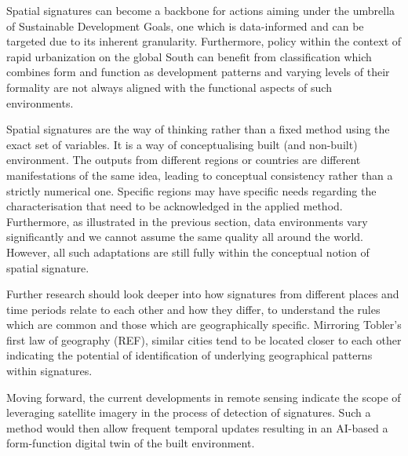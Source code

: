Spatial signatures can become a backbone for actions aiming under the umbrella of
Sustainable Development Goals, one which is data-informed and can be targeted
due to its inherent granularity. Furthermore, policy within the context of rapid
urbanization on the global South can benefit from classification which combines
form and function as development patterns and varying levels of their formality
are not always aligned with the functional aspects of such environments.

Spatial signatures are the way of thinking rather than a fixed method using the
exact set of variables. It is a way of conceptualising built (and non-built)
environment. The outputs from different regions or countries are different
manifestations of the same idea, leading to conceptual consistency rather than
a strictly numerical one. Specific regions may have specific needs regarding the
characterisation that need to be acknowledged in the applied method. Furthermore,
as illustrated in the previous section, data environments vary significantly and
we cannot assume the same quality all around the world. However, all such
adaptations are still fully within the conceptual notion of spatial signature.

Further research should look deeper into how signatures from different places
and time periods relate to each other and how they differ, to understand the
rules which are common and those which are geographically specific. Mirroring
Tobler's first law of geography (REF), similar cities tend to be located closer
to each other indicating the potential of identification of underlying
geographical patterns within signatures.

Moving forward, the current developments in remote sensing indicate the scope of
leveraging satellite imagery in the process of detection of signatures. Such a
method would then allow frequent temporal updates resulting in an AI-based
a form-function digital twin of the built environment.



